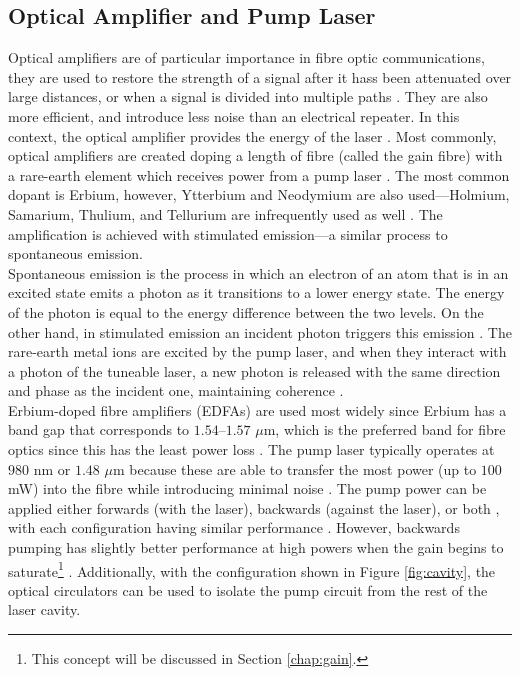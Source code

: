 \subsection{Optical Amplifier and Pump Laser}
Optical amplifiers are of particular importance in fibre optic communications, they are used to restore the strength of a signal after it hass been attenuated over large distances, or when a signal is divided into multiple paths \cite{alazzawi, starodoumov}. They are also more efficient, and introduce less noise than an electrical repeater. In this context, the optical amplifier provides the energy of the laser \cite{alazzawi}. Most commonly, optical amplifiers are created  doping a length of fibre (called the gain fibre) with a rare-earth element which receives power from a pump laser \cite{agrawal2002, alazzawi, starodoumov}. The most common dopant is Erbium, however, Ytterbium and Neodymium are also used---Holmium, Samarium, Thulium, and Tellurium are infrequently used as well \cite{agrawal2002}. The amplification is achieved with stimulated emission---a similar process to spontaneous emission. \\

Spontaneous emission is the process in which an electron of an atom that is in an excited state emits a photon as it transitions to a lower energy state. The energy of the photon is equal to the energy difference between the two levels. On the other hand, in stimulated emission an incident photon triggers this emission \cite{alazzawi}. The rare-earth metal ions are excited by the pump laser, and when they interact with a photon of the tuneable laser, a new photon is released with the same direction and phase as the incident one, maintaining coherence \cite{alazzawi}. \\

Erbium-doped fibre amplifiers (EDFAs) are used most widely since Erbium has a band gap that corresponds to $1.54$--$1.57$ $\mu$m, which is the preferred band for fibre optics since this has the least power loss \cite{agrawal2002, alazzawi, starodoumov}. The pump laser typically operates at $980$ nm or $1.48$ $\mu$m because these are able to transfer the most power (up to $100$ mW) into the fibre while introducing minimal noise \cite{agrawal2002, alazzawi, becker, starodoumov}. The pump power can be applied either forwards (with the laser), backwards (against the laser), or both \cite{alazzawi}, with each configuration having similar performance \cite{agrawal2002}. However, backwards pumping has slightly better performance at high powers when the gain begins to saturate\footnote{This concept will be discussed in Section \ref{chap:gain}.} \cite{agrawal2002}. Additionally, with the configuration shown in Figure \ref{fig:cavity}, the optical circulators can be used to isolate the pump circuit from the rest of the laser cavity. \\

